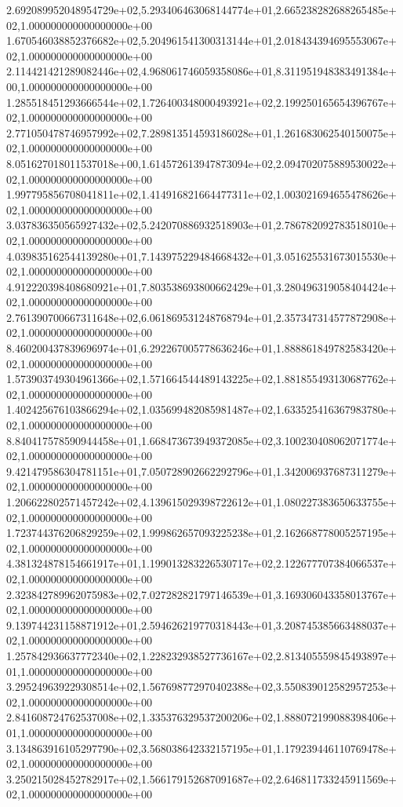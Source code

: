 2.692089952048954729e+02,5.293406463068144774e+01,2.665238282688265485e+02,1.000000000000000000e+00
1.670546038852376682e+02,5.204961541300313144e+01,2.018434394695553067e+02,1.000000000000000000e+00
2.114421421289082446e+02,4.968061746059358086e+01,8.311951948383491384e+00,1.000000000000000000e+00
1.285518451293666544e+02,1.726400348000493921e+02,2.199250165654396767e+02,1.000000000000000000e+00
2.771050478746957992e+02,7.289813514593186028e+01,1.261683062540150075e+02,1.000000000000000000e+00
8.051627018011537018e+00,1.614572613947873094e+02,2.094702075889530022e+02,1.000000000000000000e+00
1.997795856708041811e+02,1.414916821664477311e+02,1.003021694655478626e+02,1.000000000000000000e+00
3.037836350565927432e+02,5.242070886932518903e+01,2.786782092783518010e+02,1.000000000000000000e+00
4.039835162544139280e+01,7.143975229484668432e+01,3.051625531673015530e+02,1.000000000000000000e+00
4.912220398408680921e+01,7.803538693800662429e+01,3.280496319058404424e+02,1.000000000000000000e+00
2.761390700667311648e+02,6.061869531248768794e+01,2.357347314577872908e+02,1.000000000000000000e+00
8.460200437839696974e+01,6.292267005778636246e+01,1.888861849782583420e+02,1.000000000000000000e+00
1.573903749304961366e+02,1.571664544489143225e+02,1.881855493130687762e+02,1.000000000000000000e+00
1.402425676103866294e+02,1.035699482085981487e+02,1.633525416367983780e+02,1.000000000000000000e+00
8.840417578590944458e+01,1.668473673949372085e+02,3.100230408062071774e+02,1.000000000000000000e+00
9.421479586304781151e+01,7.050728902662292796e+01,1.342006937687311279e+02,1.000000000000000000e+00
1.206622802571457242e+02,4.139615029398722612e+01,1.080227383650633755e+02,1.000000000000000000e+00
1.723744376206829259e+02,1.999862657093225238e+01,2.162668778005257195e+02,1.000000000000000000e+00
4.381324878154661917e+01,1.199013283226530717e+02,2.122677707384066537e+02,1.000000000000000000e+00
2.323842789962075983e+02,7.027282821797146539e+01,3.169306043358013767e+02,1.000000000000000000e+00
9.139744231158871912e+01,2.594626219770318443e+01,3.208745385663488037e+02,1.000000000000000000e+00
1.257842936637772340e+02,1.228232938527736167e+02,2.813405559845493897e+01,1.000000000000000000e+00
3.295249639229308514e+02,1.567698772970402388e+02,3.550839012582957253e+02,1.000000000000000000e+00
2.841608724762537008e+02,1.335376329537200206e+02,1.888072199088398406e+01,1.000000000000000000e+00
3.134863916105297790e+02,3.568038642332157195e+01,1.179239446110769478e+02,1.000000000000000000e+00
3.250215028452782917e+02,1.566179152687091687e+02,2.646811733245911569e+02,1.000000000000000000e+00
